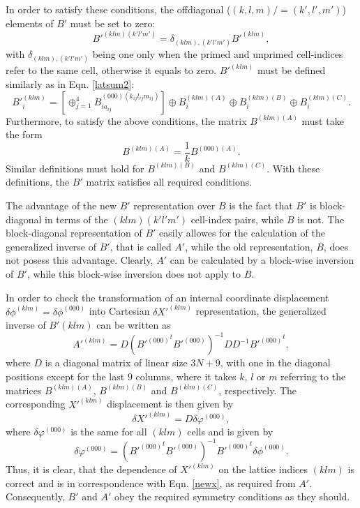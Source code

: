 \documentclass[prl,aps,preprint,superbib,12pt]{revtex4}
\begin{document}
In order to satisfy these conditions, the offdiagonal 
($(k,l,m)/=(k',l',m')$)
elements of $B'$ must be set to zero:
\begin{equation} \label{kronecker}
B'^{(klm)(k'l'm')} = \delta_{(klm),(k'l'm')} B'^{(klm)} ,
\end{equation}
with $\delta_{(klm),(k'l'm')}$ being one only when the primed
and unprimed cell-indices refer to the same cell, otherwise 
it equals to zero.
$B'^{(klm)}$ must be defined similarly as in Eqn. \ref{latsum2}:
\begin{equation} \label{latsum4}
B'^{(klm)}_{i} =
[\oplus_{j=1}^{4}
B^{(000)(k_{ij}l_{ij}m_{ij})}_{ia_{ij}}
] \oplus B^{(klm)(A)}_{i} \oplus B^{(klm)(B)}_{i} 
\oplus B^{(klm)(C)}_{i} .
\end{equation}
Furthermore, to satisfy the above conditions, 
the matrix $B^{(klm)(A)}$ must take the form
\begin{equation} \label{matba}
B^{(klm)(A)} = \frac{1}{k} B^{(000)(A)} .
\end{equation}
Similar definitions must hold for $B^{(klm)(B)}$ and
$B^{(klm)(C)}$. 
With these definitions, the $B'$ matrix satisfies all
required conditions.

The advantage of the new $B'$ representation over $B$ is the fact
that $B'$ is block-diagonal in terms of the $(klm)(k'l'm')$
cell-index pairs, while $B$ is not. The block-diagonal representation
of $B'$ easily allowes for the calculation of the generalized
inverse of $B'$, that is called $A'$, while the old representation,
$B$, does not posess this advantage. Clearly, $A'$ can be calculated
by a block-wise inversion of $B'$, while this block-wise inversion
does not apply to $B$.

In order to check the transformation of an internal
coordinate displacement 
$\delta \phi^{(klm)}=\delta \phi^{(000)}$ into 
Cartesian $\delta X'^{(klm)}$
representation, the generalized inverse of $B'{(klm)}$ 
can be written as
\begin{equation}
A'^{(klm)} = D {\left({B'^{(000)}}^t B'^{(000)}\right)}^{-1} D D^{-1} {B'^{(000)}}^t ,
\end{equation}
where $D$ is a diagonal matrix of linear size $3N+9$, with one in the
diagonal positions except for the last $9$ columns, where it takes
$k$, $l$ or $m$ referring to the matrices $B^{(klm)(A)}$, 
$B^{(klm)(B)}$ and $B^{(klm)(C)}$, respectively.
The corresponding $X'^{(klm)}$ displacement is then given by
\begin{equation}
\delta X'^{(klm)} = D \delta \varphi^{(000)} ,
\end{equation}
where $\delta \varphi^{(000)}$ is the same for all $(klm)$ cells and
is given by
\begin{equation}
\delta \varphi^{(000)} = 
{\left({B'^{(000)}}^t B'^{(000)}\right)}^{-1} {B'^{(000)}}^t 
\delta \phi^{(000)}.
\end{equation}
Thus, it is clear, that the dependence of $X'^{(klm)}$ on the
lattice indices $(klm)$ is correct and is in correspondence with
Eqn. \ref{newx}, as required from $A'$. Consequently, $B'$ and $A'$
obey the required symmetry conditions as they should.
\end{document}
